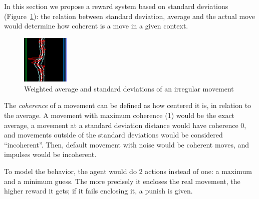 In this section we propose a reward system based on standard deviations (Figure~\ref{fig:stdexample}): the relation between standard deviation, average and the actual move would determine how coherent is a move in a given context.
\begin{figure}
    \centering
    \includegraphics[width=0.2\textwidth]{img/graphSTD.png}
		\caption{Weighted average and standard deviations of an irregular movement}
		\label{fig:stdexample}
\end{figure}

The \emph{coherence} of a movement can be defined as how centered it is, in relation to the average. A movement with maximum coherence (1) would be the exact average, a movement at a standard deviation distance would have coherence 0, and movements outside of the standard deviations would be considered ``incoherent''. Then, default movement with noise would be coherent moves, and impulses would be incoherent.

To model the behavior, the agent would do 2 actions instead of one: a maximum and a minimum guess. The more precisely it encloses the real movement, the higher reward it gets; if it fails enclosing it, a punish is given.

